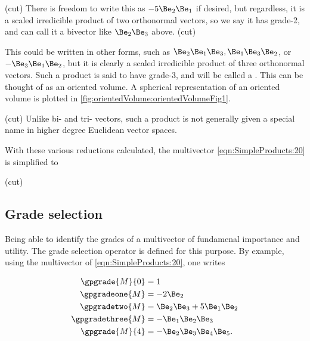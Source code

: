 (cut)
There is freedom to write this as \( - 5 \Be_2 \Be_1 \) if desired, but regardless, it is a
scaled irredicible product of two orthonormal vectors, so we say it has grade-2, and can call it a bivector like \( \Be_2 \Be_3 \) above.
(cut)

This could be written in other forms, such as \( \Be_2 \Be_1 \Be_3, \Be_1 \Be_3 \Be_2 \), or \( -\Be_3 \Be_1 \Be_2 \), but it is clearly a scaled irredicible product of three orthonormal vectors.
Such a product is said to have grade-3, and will be called a .
This can be thought of as an oriented volume.
A spherical representation of an oriented volume is plotted in \cref{fig:orientedVolume:orientedVolumeFig1}.

(cut)
Unlike bi- and tri- vectors, such a product is not generally given a special name in higher degree Euclidean vector spaces.

With these various reductions calculated, the multivector \cref{eqn:SimpleProducts:20} is simplified to

(cut)

\subsection{Grade selection}

Being able to identify the grades of a multivector of fundamenal importance and utility.
The grade selection operator is defined for this purpose.
By example, using the multivector of \cref{eqn:SimpleProducts:20}, one writes

\begin{dmath}\label{eqn:SimpleProducts:140}
\begin{aligned}
   \gpgrade{M}{0} &= 1 \\
   \gpgradeone{M} &= - 2 \Be_2 \\
   \gpgradetwo{M} &= \Be_2 \Be_3 + 5 \Be_1 \Be_2 \\
   \gpgradethree{M} &= - \Be_1 \Be_2 \Be_3 \\
   \gpgrade{M}{4} &= -\Be_2 \Be_3 \Be_4 \Be_5.
\end{aligned}
\end{dmath}

